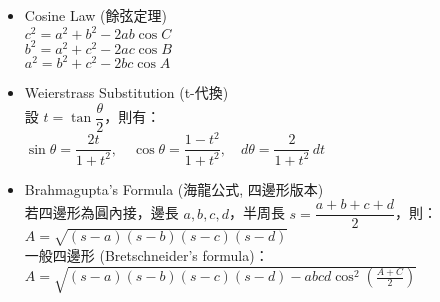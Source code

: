 \begin{itemize}
\setlength\itemsep{0.3em}

  \item Cosine Law (餘弦定理)\\
    $c^2 = a^2 + b^2 - 2ab\cos C$ \\
    $b^2 = a^2 + c^2 - 2ac\cos B$ \\
    $a^2 = b^2 + c^2 - 2bc\cos A$

  \item Weierstrass Substitution (t-代換)\\
    設 $t = \tan \dfrac{\theta}{2}$，則有：\\
    $\sin \theta = \dfrac{2t}{1+t^2},\quad 
      \cos \theta = \dfrac{1-t^2}{1+t^2},\quad
      d\theta = \dfrac{2}{1+t^2}\,dt$

  \item Brahmagupta’s Formula (海龍公式, 四邊形版本)\\
    若四邊形為圓內接，邊長 $a,b,c,d$，半周長 $s=\dfrac{a+b+c+d}{2}$，則：\\
    $A = \sqrt{(s-a)(s-b)(s-c)(s-d)}$ \\
    一般四邊形 (Bretschneider’s formula)：\\
    $A = \sqrt{(s-a)(s-b)(s-c)(s-d) - abcd \cos^2\!\left(\frac{A+C}{2}\right)}$
\end{itemize}